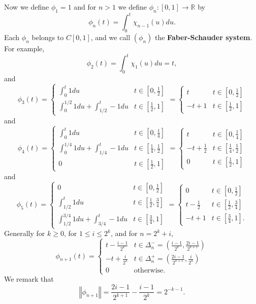 \documentclass{article}
\newcommand{\norm}[1]{\left\Vert #1 \right\Vert}
\theoremstyle{definition}
\begin{document}
Now we define $\phi_1=1$ and for $n>1$ we define $\phi_n:[0,1] \to \mathbb{R}$ by
\[
\phi_n(t) = \int_0^t \chi_{n-1}(u) du.
\]
Each $\phi_n$ belongs to $C[0,1]$, and we call $(\phi_n)$ the \textbf{Faber-Schauder system}. 
For example,
\[
\phi_2(t) = \int_0^t \chi_1(u) du = t,
\]
 and
\[
 \phi_3(t) = \begin{cases}
\int_0^t 1du&t \in \left[0,\frac{1}{2}\right]\\
 \int_0^{1/2} 1du + \int_{1/2}^t -1 du&t \in \left[\frac{1}{2},1\right]
 \end{cases}
 =\begin{cases}
t &t \in \left[0,\frac{1}{2}\right]\\
-t+1 &t \in \left[\frac{1}{2},1\right]
 \end{cases}
\]
and
\[
 \phi_4(t) = \begin{cases}
\int_0^t 1du&t \in \left[0,\frac{1}{4}\right]\\
 \int_0^{1/4} 1du + \int_{1/4}^t -1 du&t \in \left[\frac{1}{4},\frac{1}{2} \right]\\
 0&t \in \left[\frac{1}{2},1\right]
 \end{cases}
 =\begin{cases}
t &t \in \left[0,\frac{1}{4}\right]\\
-t+\frac{1}{2} &t \in \left[\frac{1}{4},\frac{1}{2} \right]\\
 0&t \in \left[\frac{1}{2},1\right]
 \end{cases}
\]
and
\[
 \phi_5(t) = \begin{cases}
 0&t \in \left[0,\frac{1}{2}\right]\\
\int_{1/2}^t 1du&t \in \left[\frac{1}{2},\frac{3}{4}\right]\\
 \int_{1/2}^{3/4} 1du + \int_{3/4}^t -1 du&t \in \left[\frac{3}{4},1 \right]
  \end{cases}
 =\begin{cases}
  0&t \in \left[0,\frac{1}{2}\right]\\
t -\frac{1}{2}&t \in\left[\frac{1}{2},\frac{3}{4}\right]\\
-t+1 &t \in \left[\frac{3}{4},1 \right].
 \end{cases}
\]
Generally  for $k \geq 0$, for $1 \leq i \leq 2^k$, and for $n=2^k+i$,
\[
\phi_{n+1}(t) = \begin{cases}
t-\frac{i-1}{2^k}&t \in \Delta_{n}^-=\left(\frac{i-1}{2^k}, \frac{2i-1}{2^{k+1}}\right)\\
-t+ \frac{i}{2^{k}}&t \in \Delta_{n}^+=\left(\frac{2i-1}{2^{k+1}}, \frac{i}{2^{k}}\right)\\
0&\textrm{otherwise}.
\end{cases}
\]
We remark that 
\[
\norm{\phi_{n+1}} = \frac{2i-1}{2^{k+1}}-\frac{i-1}{2^k} = 2^{-k-1}.
\]
\end{document}
